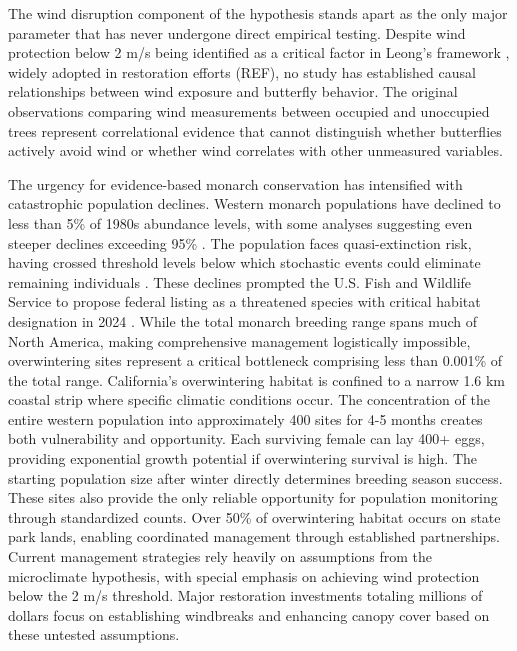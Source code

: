 The wind disruption component of the hypothesis stands apart as the only major parameter that has never undergone direct empirical testing. Despite wind protection below 2 m/s being identified as a critical factor in Leong's framework \citep{leongEvaluationManagementCalifornia2016}, widely adopted in restoration efforts (REF), no study has established causal relationships between wind exposure and butterfly behavior. The original observations comparing wind measurements between occupied and unoccupied trees represent correlational evidence that cannot distinguish whether butterflies actively avoid wind or whether wind correlates with other unmeasured variables.

The urgency for evidence-based monarch conservation has intensified with catastrophic population declines. Western monarch populations have declined to less than 5\% of 1980s abundance levels, with some analyses suggesting even steeper declines exceeding 95\% \citep{peltonWesternMonarchPopulation2019}. The population faces quasi-extinction risk, having crossed threshold levels below which stochastic events could eliminate remaining individuals \citep{schultzCitizenScienceMonitoring2017}. These declines prompted the U.S. Fish and Wildlife Service to propose federal listing as a threatened species with critical habitat designation in 2024 \citep{u.s.fishandwildlifeserviceEndangeredThreatenedWildlife2024}. While the total monarch breeding range spans much of North America, making comprehensive management logistically impossible, overwintering sites represent a critical bottleneck comprising less than 0.001\% of the total range. California's overwintering habitat is confined to a narrow 1.6 km coastal strip where specific climatic conditions occur. The concentration of the entire western population into approximately 400 sites for 4-5 months creates both vulnerability and opportunity. Each surviving female can lay 400+ eggs, providing exponential growth potential if overwintering survival is high. The starting population size after winter directly determines breeding season success. These sites also provide the only reliable opportunity for population monitoring through standardized counts. Over 50\% of overwintering habitat occurs on state park lands, enabling coordinated management through established partnerships. Current management strategies rely heavily on assumptions from the microclimate hypothesis, with special emphasis on achieving wind protection below the 2 m/s threshold. Major restoration investments totaling millions of dollars focus on establishing windbreaks and enhancing canopy cover based on these untested assumptions.

